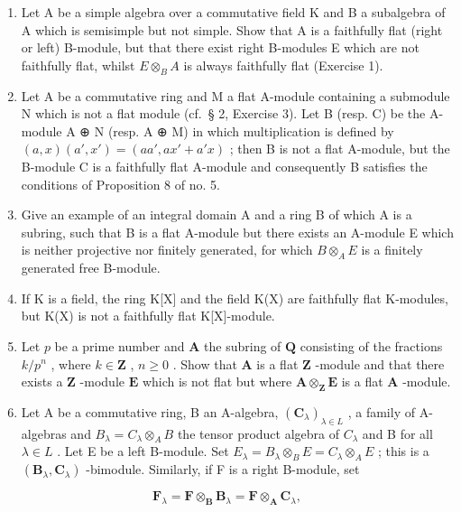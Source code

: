 \begin{enumerate}
\def\labelenumi{\arabic{enumi}.}
\setcounter{enumi}{3}
\item
  Let A be a simple algebra over a commutative field K and B a subalgebra of A which is semisimple but not simple. Show that A is a faithfully flat (right or left) B-module, but that there exist right B-modules E which are not faithfully flat, whilst \(E \otimes_{B} A\) is always faithfully flat (Exercise 1).
\item
  Let A be a commutative ring and M a flat A-module containing a submodule N which is not a flat module (cf.~§ 2, Exercise 3). Let B (resp. C) be the A-module A ⊕ N (resp. A ⊕ M) in which multiplication is defined by \((a, x)(a', x') = (aa', ax' + a'x)\) ; then B is not a flat A-module, but the B-module C is a faithfully flat A-module and consequently B satisfies the conditions of Proposition 8 of no. 5.
\item
  Give an example of an integral domain A and a ring B of which A is a subring, such that B is a flat A-module but there exists an A-module E which is neither projective nor finitely generated, for which \(B \otimes_{A} E\) is a finitely generated free B-module.
\item
  If K is a field, the ring K{[}X{]} and the field K(X) are faithfully flat K-modules, but K(X) is not a faithfully flat K{[}X{]}-module.
\item
  Let \(p\) be a prime number and \(\mathbf{A}\) the subring of \(\mathbf{Q}\) consisting of the fractions \(k / p^n\) , where \(k \in \mathbf{Z}\) , \(n \geqslant 0\) . Show that \(\mathbf{A}\) is a flat \(\mathbf{Z}\) -module and that there exists a \(\mathbf{Z}\) -module \(\mathbf{E}\) which is not flat but where \(\mathbf{A} \otimes_{\mathbf{Z}} \mathbf{E}\) is a flat \(\mathbf{A}\) -module.
\item
  Let A be a commutative ring, B an A-algebra, \((\mathbf{C}_{\lambda})_{\lambda \in L}\) , a family of A-algebras and \(B_{\lambda} = C_{\lambda} \otimes_{A} B\) the tensor product algebra of \(C_{\lambda}\) and B for all \(\lambda \in L\) . Let E be a left B-module. Set \(E_{\lambda} = B_{\lambda} \otimes_{B} E = C_{\lambda} \otimes_{A} E\) ; this is a \((\mathbf{B}_{\lambda}, \mathbf{C}_{\lambda})\) -bimodule. Similarly, if F is a right B-module, set
\end{enumerate}

\[
\mathbf {F} _ {\lambda} = \mathbf {F} \otimes_ {\mathbf {B}} \mathbf {B} _ {\lambda} = \mathbf {F} \otimes_ {\mathbf {A}} \mathbf {C} _ {\lambda},
\]

